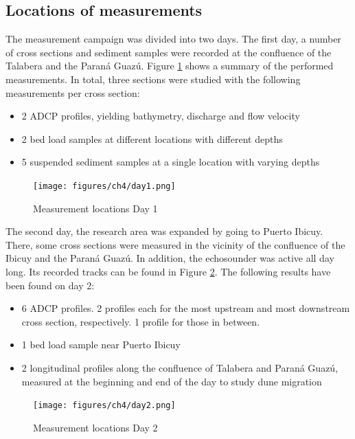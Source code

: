 \subsection{Locations of measurements}
The measurement campaign was divided into two days. The first day, a number of cross sections and sediment samples were recorded at the confluence of the Talabera and the Paraná Guazú. Figure \ref{fig:measurements day1} shows a summary of the performed measurements. In total, three sections were studied with the following measurements per cross section:
\begin{itemize}
    \item 2 ADCP profiles, yielding bathymetry, discharge and flow velocity
    \item 2 bed load samples at different locations with different depths
    \item 5 suspended sediment samples at a single location with varying depths
\end{itemize}

\begin{figure}[H]
    \centering
    \texttt{[image: figures/ch4/day1.png]}
    \caption{Measurement locations Day 1}
    \label{fig:measurements day1}
\end{figure}

The second day, the research area was expanded by going to Puerto Ibicuy. There, some cross sections were measured in the vicinity of the confluence of the Ibicuy and the Paraná Guazú. In addition, the echosounder was active all day long. Its recorded tracks can be found in Figure \ref{fig:measurements day2}. The following results have been found on day 2:
\begin{itemize}
    \item 6 ADCP profiles. 2 profiles each for the most upstream and most downstream cross section, respectively. 1 profile for those in between. 
    \item 1 bed load sample near Puerto Ibicuy
    \item 2 longitudinal profiles along the confluence of Talabera and Paraná Guazú, measured at the beginning and end of the day to study dune migration
\end{itemize}

\begin{figure}[H]
    \centering
    \texttt{[image: figures/ch4/day2.png]}
    \caption{Measurement locations Day 2}
    \label{fig:measurements day2}
\end{figure}

